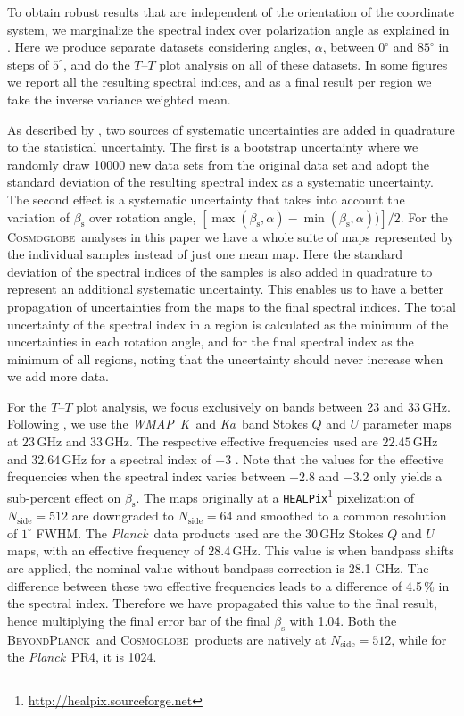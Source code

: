 \documentclass[twocolumn]{../../common/aa}
\def\WMAP{\emph{WMAP}}
\def\Planck{\emph{Planck}}
\def\healpix{\texttt{HEALPix}}
\newcommand{\bp}{\textsc{BeyondPlanck}}
\newcommand{\cosmoglobe}{\textsc{Cosmoglobe}}
\newcommand{\Cosmoglobe}{\textsc{Cosmoglobe}}
\newcommand{\K}[0]{\textit K}
\newcommand{\Ka}[0]{\textit{Ka}}
\begin{document}
To obtain robust results that are independent of the orientation of the coordinate system, we marginalize the spectral index over polarization angle as explained in 
\citet{fuskeland2014,fuskeland:2019}. Here we produce separate datasets considering angles, $\alpha$, between 
$0^\circ$ and $85^\circ$ in steps of $5^\circ$,
and do the $T$--$T$ plot analysis on all of these datasets. In some figures we report all the resulting spectral indices, and as a final result per region we take the inverse variance weighted mean. 

As described by \citet{fuskeland:2019}, two sources of systematic uncertainties are added in quadrature to the statistical uncertainty. The first is a bootstrap uncertainty where we randomly draw 10000 new data sets from the original data set and adopt the standard deviation of the resulting spectral index as a systematic uncertainty. The second effect is a systematic uncertainty that takes into account the variation of $\beta_\mathrm s$ over rotation angle, $[\max(\beta_\mathrm s,\alpha ) - \min(\beta_\mathrm s,\alpha))]/2$. For the \Cosmoglobe\ analyses in this paper we have a whole suite of maps represented by the individual samples instead of just one mean map. Here the standard deviation of the spectral indices of the samples is also added in quadrature to represent an additional systematic uncertainty. This enables us to have a better propagation of uncertainties from the maps to the final spectral indices. The total uncertainty of the spectral index in a region is calculated as the minimum of the uncertainties in each rotation angle, and for the final spectral index as the minimum of all regions, noting that the uncertainty should never increase when we add more data.


For the $T$--$T$ plot  analysis, we focus exclusively on bands between 23 and 33\,GHz. Following \citet{fuskeland2014}, we use the \WMAP\ \K\ and \Ka\ band Stokes $Q$ and $U$ parameter maps at $23$\,GHz and $33$\,GHz. The respective effective frequencies used are $22.45$\,GHz and $32.64$\,GHz for a spectral index of $-3$ \citep{page2003a}. Note that the values for the effective frequencies when the spectral index varies between $-2.8$ and $-3.2$ only yields a sub-percent effect on $\beta_\mathrm{s}$. The maps originally at a \healpix\footnote{\url{http://healpix.sourceforge.net}} pixelization of $N_\textrm{side}=512$ are downgraded to $N_\textrm{side}=64$ and smoothed to a common resolution of $1^\circ$ FWHM.
The \Planck\ data products used are the $30$\,GHz Stokes $Q$ and $U$ maps, with an effective frequency of $28.4$\,GHz. This value is when bandpass shifts are applied, the nominal value without bandpass correction is 28.1 GHz. The difference between these two effective frequencies leads to a difference of 4.5\,\% in the spectral index. Therefore we have propagated this value to the final result, hence multiplying the final error bar of the final $\beta_\mathrm s$ with 1.04. Both the \bp\ and \cosmoglobe\ products are natively at $N_\textrm{side}=512$, while for the \Planck\ PR4, it is 1024.
\end{document}
